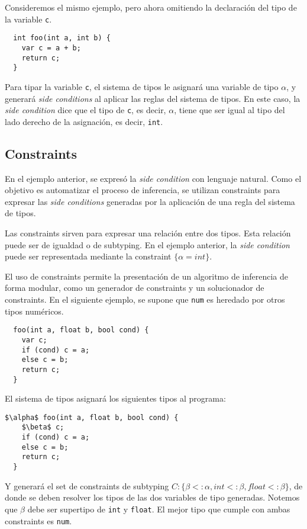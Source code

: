 Consideremos el mismo ejemplo, pero ahora omitiendo la declaración del tipo de la variable \texttt{c}.

\begin{lstlisting}
  int foo(int a, int b) {
    var c = a + b;
    return c;
  }
\end{lstlisting}

Para tipar la variable \texttt{c}, el sistema de tipos le asignará una variable de tipo $\alpha$, y generará \textit{side conditions} al aplicar las reglas del sistema de tipos. En este caso, la \textit{side condition} dice que el tipo de \texttt{c}, es decir, $\alpha$, tiene que ser igual al tipo del lado derecho de la asignación, es decir, \texttt{int}.

\subsection{Constraints} \label{constraints}
En el ejemplo anterior, se expresó la \textit{side condition} con lenguaje natural. Como el objetivo es automatizar el proceso de inferencia, se utilizan constraints para expresar las \textit{side conditions} generadas por la aplicación de una regla del sistema de tipos.

Las constraints sirven para expresar una relación entre dos tipos. Esta relación puede ser de igualdad o de subtyping. En el ejemplo anterior, la \textit{side condition} puede ser representada mediante la constraint $\{\alpha = int\}$.

El uso de constraints permite la presentación de un algoritmo de inferencia de forma modular, como un generador de constraints y un solucionador de constraints. En el siguiente ejemplo, se supone que \texttt{num} es heredado por otros tipos numéricos.

\begin{lstlisting}
  foo(int a, float b, bool cond) {
    var c;
    if (cond) c = a;
    else c = b;
    return c;
  }
\end{lstlisting}

El sistema de tipos asignará los siguientes tipos al programa:
\begin{lstlisting}[mathescape=true]
  $\alpha$ foo(int a, float b, bool cond) {
    $\beta$ c;
    if (cond) c = a;
    else c = b;
    return c;
  }
\end{lstlisting}
Y generará el set de constraints de subtyping $C: \{\beta <: \alpha, int <: \beta, float <: \beta\}$, de donde se deben resolver los tipos de las dos variables de tipo generadas. Notemos que $\beta$ debe ser supertipo de \texttt{int} y \texttt{float}. El mejor tipo que cumple con ambas constraints es \texttt{num}.
